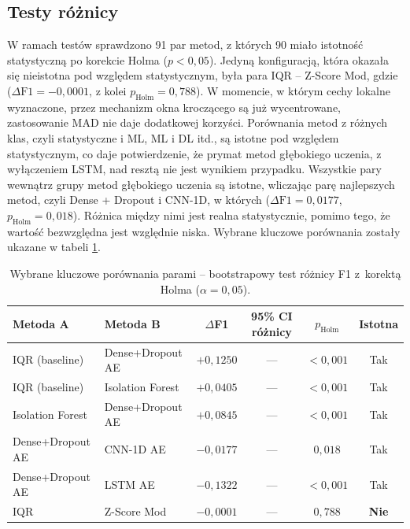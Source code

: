 \documentclass[a4paper,twoside,12pt]{book}
\begin{document}
\subsection{Testy różnicy}

W ramach testów sprawdzono 91 par metod, z których 90 miało istotność statystyczną po korekcie Holma ($p < 0{,}05$). Jedyną konfiguracją, która okazała się nieistotna pod względem statystycznym, była para IQR – Z-Score Mod, gdzie ($\Delta\text{F1} = -0{,}0001$, z kolei $p_\text{Holm} = 0{,}788$). W momencie, w którym cechy lokalne wyznaczone, przez mechanizm okna kroczącego są już wycentrowane, zastosowanie MAD nie daje dodatkowej korzyści. Porównania metod z różnych klas, czyli statystyczne i ML, ML i DL itd., są istotne pod względem statystycznym, co daje potwierdzenie, że prymat metod głębokiego uczenia, z wyłączeniem LSTM, nad resztą nie jest wynikiem przypadku. Wszystkie pary wewnątrz grupy metod głębokiego uczenia są istotne, wliczając parę najlepszych metod, czyli Dense + Dropout i CNN-1D, w których ($\Delta\text{F1} = 0{,}0177$, $p_\text{Holm} = 0{,}018$). Różnica między nimi jest realna statystycznie, pomimo tego, że wartość bezwzględna jest względnie niska. Wybrane kluczowe porównania zostały ukazane w tabeli \ref{tab:pary_kluczowe}. 

\begin{table}%
	\centering
	\caption{Wybrane kluczowe porównania parami -- bootstrapowy
		test różnicy F1 z~korektą Holma ($\alpha=0{,}05$).}
	\label{tab:pary_kluczowe}
	\small
	\begin{tabular}{llcccc}
		\toprule
		\textbf{Metoda A} & \textbf{Metoda B}
		& $\Delta$\textbf{F1}
		& \textbf{95\% CI różnicy}
		& $p_\text{Holm}$
		& \textbf{Istotna} \\
		\midrule
		IQR (baseline)   & Dense+Dropout AE & $+0{,}1250$ & --- & $<0{,}001$ & Tak \\
		IQR (baseline)   & Isolation Forest & $+0{,}0405$ & --- & $<0{,}001$ & Tak \\
		Isolation Forest & Dense+Dropout AE & $+0{,}0845$ & --- & $<0{,}001$ & Tak \\
		Dense+Dropout AE & CNN-1D AE        & $-0{,}0177$ & --- & $0{,}018$  & Tak \\
		Dense+Dropout AE & LSTM AE          & $-0{,}1322$ & --- & $<0{,}001$ & Tak \\
		IQR              & Z-Score Mod      & $-0{,}0001$ & --- & $0{,}788$  & \textbf{Nie} \\
		\bottomrule
	\end{tabular}
\end{table}
\end{document}
